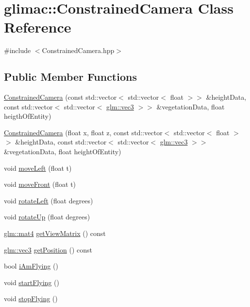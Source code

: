 \hypertarget{classglimac_1_1_constrained_camera}{}\section{glimac\+:\+:Constrained\+Camera Class Reference}
\label{classglimac_1_1_constrained_camera}


{\ttfamily \#include $<$Constrained\+Camera.\+hpp$>$}

\subsection*{Public Member Functions}
\begin{DoxyCompactItemize}
\item 
\hyperlink{classglimac_1_1_constrained_camera_a41efc809fafa6a68e7c2870a7c3fbfa1}{Constrained\+Camera} (const std\+::vector$<$ std\+::vector$<$ float $>$$>$ \&height\+Data, const std\+::vector$<$ std\+::vector$<$ \hyperlink{group__core__types_ga1c47e8b3386109bc992b6c48e91b0be7}{glm\+::vec3} $>$$>$ \&vegetation\+Data, float heigth\+Of\+Entity)
\item 
\hyperlink{classglimac_1_1_constrained_camera_a9ff368356c4c751a949c648759e5de78}{Constrained\+Camera} (float x, float z, const std\+::vector$<$ std\+::vector$<$ float $>$$>$ \&height\+Data, const std\+::vector$<$ std\+::vector$<$ \hyperlink{group__core__types_ga1c47e8b3386109bc992b6c48e91b0be7}{glm\+::vec3} $>$$>$ \&vegetation\+Data, float height\+Of\+Entity)
\item 
void \hyperlink{classglimac_1_1_constrained_camera_a3a74d3c7f7804a0b1a64a46b2d602cea}{move\+Left} (float t)
\item 
void \hyperlink{classglimac_1_1_constrained_camera_a3152184b206c433d3b2619c0a86b22e1}{move\+Front} (float t)
\item 
void \hyperlink{classglimac_1_1_constrained_camera_a7dec7758e2a9c7b97c95f332410ae606}{rotate\+Left} (float degrees)
\item 
void \hyperlink{classglimac_1_1_constrained_camera_ae6ebbd25294f956ed2f513710cecc576}{rotate\+Up} (float degrees)
\item 
\hyperlink{group__core__types_ga7dcd2365c2e368e6af5b7adeb6a9c8df}{glm\+::mat4} \hyperlink{classglimac_1_1_constrained_camera_aedb07f0ce070319d50e4600b350d4c20}{get\+View\+Matrix} () const
\item 
\hyperlink{group__core__types_ga1c47e8b3386109bc992b6c48e91b0be7}{glm\+::vec3} \hyperlink{classglimac_1_1_constrained_camera_a2d3652297267c22fbcf35efbec70349a}{get\+Position} () const
\item 
bool \hyperlink{classglimac_1_1_constrained_camera_a77a986ffa98ff09f3fcafc6c7d235e99}{i\+Am\+Flying} ()
\item 
void \hyperlink{classglimac_1_1_constrained_camera_aea3292bf2d944d9c99dd8c05e3898e54}{start\+Flying} ()
\item 
void \hyperlink{classglimac_1_1_constrained_camera_a532520a86171f57f721c37a9da6b7232}{stop\+Flying} ()
\end{DoxyCompactItemize}


